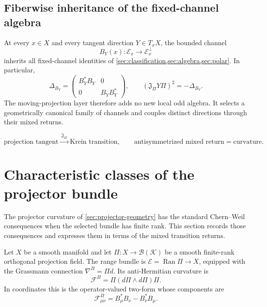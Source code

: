 \documentclass[11pt,reqno]{scrartcl}
\newcommand{\scrK}{\mathscr K}
\newcommand{\fundJ}{\mathfrak J}
\DeclareMathOperator{\Ran}{Ran}
\newcommand{\gaugeF}{\mathcal F}
\theoremstyle{plain}
\theoremstyle{definition}
\theoremstyle{remark}
\begin{document}
\subsection{Fiberwise inheritance of the fixed-channel algebra}

At every \(x\in X\) and every tangent direction \(Y\in T_xX\), the bounded
channel
\begin{equation}
  B_Y(x):\mathscr E_x\longrightarrow\mathscr E_x^\perp
\end{equation}
inherits all fixed-channel identities of \cref{sec:classification,sec:algebra,sec:polar}.  In particular,
\begin{equation}
  \Delta_{B_Y}
  =\begin{pmatrix}B_Y^*B_Y&0\\0&B_YB_Y^*\end{pmatrix},
  \qquad
  (\fundJ_\Pi Y\Pi)^2=-\Delta_{B_Y}.
  \label{eq:fiberwise-Laplacian}
\end{equation}
The moving-projection layer therefore adds no new local odd algebra.  It
selects a geometrically canonical family of channels and couples distinct
directions through their mixed returns.

\begin{equation}
  \boxed{
  \text{projection tangent}
  \xrightarrow{\ \fundJ_\Pi\ }
  \text{Krein transition},
  \qquad
  \text{antisymmetrized mixed return}
  =\text{curvature}.}
  \label{eq:projector-summary}
\end{equation}


\section{Characteristic classes of the projector bundle}
\label{sec:characteristic-classes}

The projector curvature of \cref{sec:projector-geometry} has the standard
Chern--Weil consequences when the selected bundle has finite rank.  This
section records those consequences and expresses them in terms of the mixed
transition returns.

Let \(X\) be a smooth manifold and let
\(\Pi:X\to\mathcal B(\scrK)\) be a smooth finite-rank orthogonal projection
field.  The range bundle is \(\mathscr E=\Ran\Pi\to X\), equipped with the
Grassmann connection \(\nabla^\Pi=\Pi d\).  Its anti-Hermitian curvature is
\begin{equation}
  \gaugeF^\Pi
  =\Pi(d\Pi\wedge d\Pi)\Pi.
  \label{eq:curvature-form}
\end{equation}
In coordinates this is the operator-valued two-form whose components are
\begin{equation}
  \gaugeF_{\mu\nu}^{\Pi}
  =B_\mu^*B_\nu-B_\nu^*B_\mu.
  \label{eq:curvature-return-components}
\end{equation}
\end{document}
